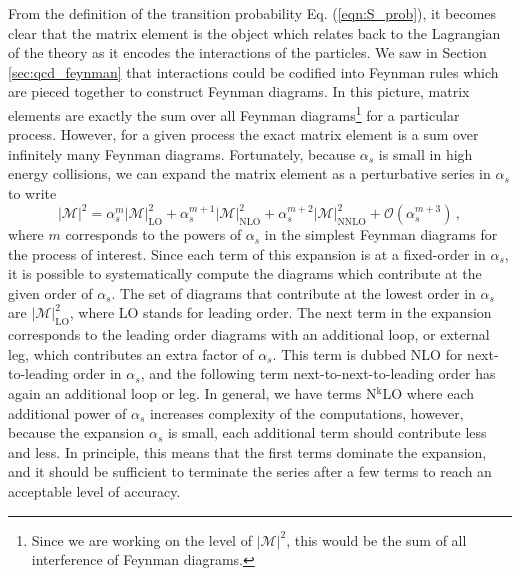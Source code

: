 \documentclass[main.tex]{subfiles}
\begin{document}
    From the definition of the transition probability
    Eq. (\ref{eqn:S_prob}), it becomes clear
    that the matrix element is the object which
    relates back to the Lagrangian of the theory
    as it encodes the interactions of the particles.
    We saw in Section \ref{sec:qcd_feynman} that
    interactions could be codified into Feynman
    rules which are pieced together to construct
    Feynman diagrams. In this picture, matrix elements
    are exactly the sum over all Feynman diagrams\footnote{Since we are working on the level
    of $|\mathcal{M}|^{2}$, this would
    be the sum of all interference of Feynman diagrams.}
    for a particular process. However, for a given
    process the exact matrix element is a sum over
    infinitely many Feynman diagrams.
    Fortunately, because $\alpha_{s}$
    is small in high energy collisions, we can expand
    the matrix element as a perturbative series in
    $\alpha_{s}$ to write
    \begin{equation}\label{eqn:matrix_element}
        |\mathcal{M}|^{2} =  \alpha_{s}^{m} |\mathcal{M}|^{2}_{\mathrm{LO}} + \alpha_{s}^{m+1} |\mathcal{M}|^{2}_{\mathrm{NLO}} + \alpha_{s}^{m+2} |\mathcal{M}|^{2}_{\mathrm{NNLO}} + \mathcal{O}(\alpha_{s}^{m+3}) \, ,
    \end{equation}
    where $m$ corresponds to the powers of $\alpha_{s}$
    in the simplest Feynman diagrams
    for the process of interest.
    Since each term of this expansion is at a fixed-order
    in $\alpha_{s}$, it is possible to systematically
    compute the diagrams which contribute at the given order of $\alpha_{s}$.
    The set of diagrams that contribute at the lowest
    order in $\alpha_{s}$ are $|\mathcal{M}|^{2}_{\mathrm{LO}}$,
    where LO stands for leading order. The next term
    in the expansion corresponds to the leading order
    diagrams with an additional loop, or external leg,
    which contributes an extra factor of $\alpha_{s}$.
    This term is dubbed NLO for next-to-leading order
    in $\alpha_{s}$, and the following term
    next-to-next-to-leading order has again an additional
    loop or leg. In general, we have terms
    N$^{\mathrm{k}}$LO where each additional power of $\alpha_{s}$
    increases complexity of the computations, however,
    because the expansion $\alpha_{s}$
    is small, each additional term should contribute
    less and less.
    In principle, this means that the first terms dominate the expansion,
    and it should be sufficient to terminate the series after
    a few terms to reach an acceptable level of accuracy.
\end{document}
